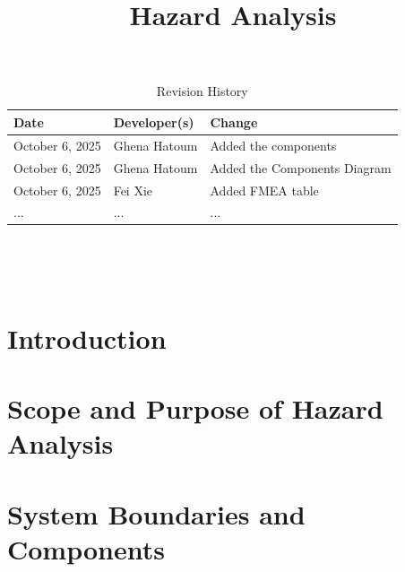 \documentclass{article}
\title{Hazard Analysis\\\progname}
\author{\authname}
\date{}
\begin{document}
\maketitle
\thispagestyle{empty}


\begin{table}[hp]
\caption{Revision History} \label{TblRevisionHistory}
\begin{tabularx}{\textwidth}{llX}
\toprule
\textbf{Date} & \textbf{Developer(s)} & \textbf{Change}\\
\midrule
October 6, 2025  & Ghena Hatoum & Added the components\\
October 6, 2025  & Ghena Hatoum & Added the Components Diagram\\
October 6, 2025 & Fei Xie & Added FMEA table\\
... & ... & ...\\
\bottomrule
\end{tabularx}
\end{table}

~\newpage

\tableofcontents

~\newpage



\section{Introduction}


\section{Scope and Purpose of Hazard Analysis}


\section{System Boundaries and Components}
\end{document}
